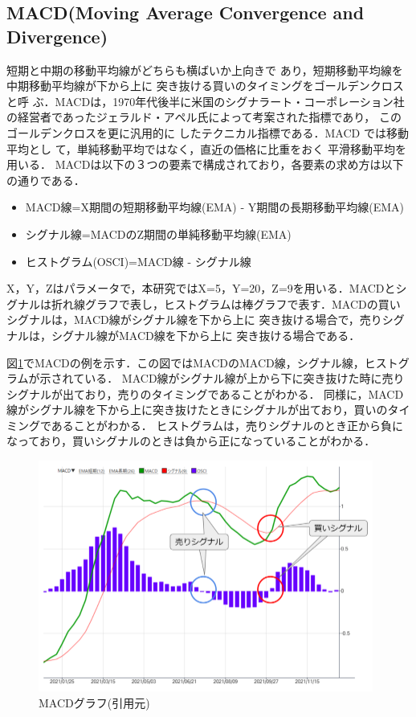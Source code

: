 \subsection{MACD(Moving Average Convergence and Divergence)}
短期と中期の移動平均線がどちらも横ばいか上向きで
あり，短期移動平均線を中期移動平均線が下から上に
突き抜ける買いのタイミングをゴールデンクロスと呼
ぶ．MACD\cite{pythontrading}は，1970年代後半に米国のシグナラート・コーポレーション社の経営者であったジェラルド・アペル氏によって考案された指標であり，
このゴールデンクロスを更に汎用的に
したテクニカル指標である．MACD では移動平均とし
て，単純移動平均ではなく，直近の価格に比重をおく
平滑移動平均を用いる．
MACDは以下の３つの要素で構成されており，各要素の求め方は以下の通りである．
\begin{itemize}
  \item MACD線=X期間の短期移動平均線(EMA) ‐ Y期間の長期移動平均線(EMA)
  \item シグナル線=MACDのZ期間の単純移動平均線(EMA)
  \item ヒストグラム(OSCI)=MACD線 - シグナル線
\end{itemize}
X，Y，Zはパラメータで，本研究ではX=5，Y=20，Z=9を用いる．MACDとシグナルは折れ線グラフで表し，ヒストグラムは棒グラフで表す\cite{pythontrading}．MACDの買いシグナルは，MACD線がシグナル線を下から上に
突き抜ける場合で，売りシグナルは，シグナル線がMACD線を下から上に
突き抜ける場合である．

図\ref{fig:macdex}でMACDの例を示す．この図ではMACDのMACD線，シグナル線，ヒストグラムが示されている．
MACD線がシグナル線が上から下に突き抜けた時に売りシグナルが出ており，売りのタイミングであることがわかる．
同様に，MACD線がシグナル線を下から上に突き抜けたときにシグナルが出ており，買いのタイミングであることがわかる．
ヒストグラムは，売りシグナルのとき正から負になっており，買いシグナルのときは負から正になっていることがわかる．
\begin{figure}[H]
  \centering
  \includegraphics[width=110mm]{fig/macd_exp.png}
  \caption{MACDグラフ(引用元\cite{macdexp})}
  \label{fig:macdex}
 \end{figure}


